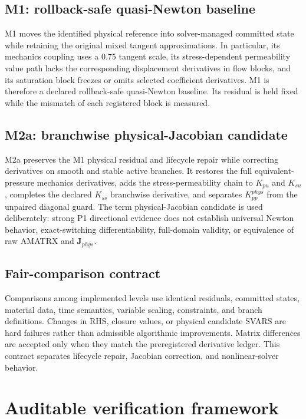 \documentclass[preprint,12pt,authoryear]{elsarticle}
\begin{document}
\subsection{M1: rollback-safe quasi-Newton baseline}

M1 moves the identified physical reference into solver-managed committed state while retaining the original mixed tangent approximations. In particular, its mechanics coupling uses a 0.75 tangent scale, its stress-dependent permeability value path lacks the corresponding displacement derivatives in flow blocks, and its saturation block freezes or omits selected coefficient derivatives. M1 is therefore a declared rollback-safe quasi-Newton baseline. Its residual is held fixed while the mismatch of each registered block is measured.

\subsection{M2a: branchwise physical-Jacobian candidate}

M2a preserves the M1 physical residual and lifecycle repair while correcting derivatives on smooth and stable active branches. It restores the full equivalent-pressure mechanics derivatives, adds the stress-permeability chain to $K_{pu}$ and $K_{su}$, completes the declared $K_{ss}$ branchwise derivative, and separates $K_{pp}^{phys}$ from the unpaired diagonal guard. The term physical-Jacobian candidate is used deliberately: strong P1 directional evidence does not establish universal Newton behavior, exact-switching differentiability, full-domain validity, or equivalence of raw AMATRX and $\mathbf{J}_{phys}$.

\subsection{Fair-comparison contract}

Comparisons among implemented levels use identical residuals, committed states, material data, time semantics, variable scaling, constraints, and branch definitions. Changes in RHS, closure values, or physical candidate SVARS are hard failures rather than admissible algorithmic improvements. Matrix differences are accepted only when they match the preregistered derivative ledger. This contract separates lifecycle repair, Jacobian correction, and nonlinear-solver behavior.

\section{Auditable verification framework}
\end{document}
